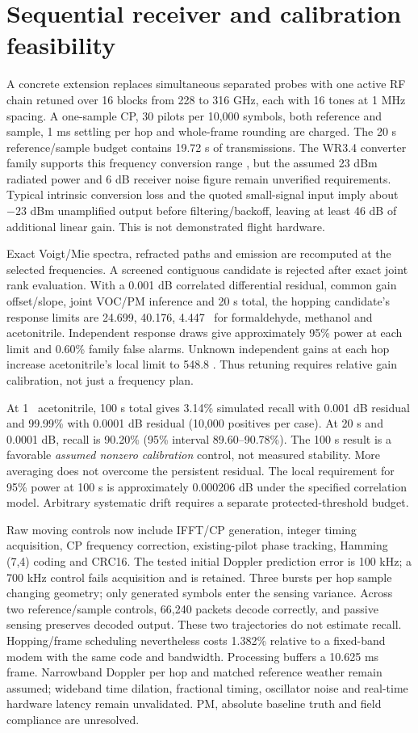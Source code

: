 \section{Sequential receiver and calibration feasibility}
A concrete extension replaces simultaneous separated probes with one active RF chain retuned over 16 blocks from 228 to 316 GHz, each with 16 tones at 1 MHz spacing. A one-sample CP, 30 pilots per 10,000 symbols, both reference and sample, 1 ms settling per hop and whole-frame rounding are charged. The 20 s reference/sample budget contains 19.72 s of transmissions. The WR3.4 converter family supports this frequency conversion range \cite{vdicc}, but the assumed 23 dBm radiated power and 6 dB receiver noise figure remain unverified requirements. Typical intrinsic conversion loss and the quoted small-signal input imply about $-23$ dBm unamplified output before filtering/backoff, leaving at least 46 dB of additional linear gain. This is not demonstrated flight hardware.

Exact Voigt/Mie spectra, refracted paths and emission are recomputed at the selected frequencies. A screened contiguous candidate is rejected after exact joint rank evaluation. With a 0.001 dB correlated differential residual, common gain offset/slope, joint VOC/PM inference and 20 s total, the hopping candidate's response limits are 24.699, 40.176, 4.447 \ugm\ for formaldehyde, methanol and acetonitrile. Independent response draws give approximately 95\% power at each limit and 0.60\% family false alarms. Unknown independent gains at each hop increase acetonitrile's local limit to 548.8 \ugm. Thus retuning requires relative gain calibration, not just a frequency plan.

At 1 \ugm\ acetonitrile, 100 s total gives 3.14\% simulated recall with 0.001 dB residual and 99.99\% with 0.0001 dB residual (10,000 positives per case). At 20 s and 0.0001 dB, recall is 90.20\% (95\% interval 89.60--90.78\%). The 100 s result is a favorable \emph{assumed nonzero calibration} control, not measured stability. More averaging does not overcome the persistent residual. The local requirement for 95\% power at 100 s is approximately 0.000206 dB under the specified correlation model. Arbitrary systematic drift requires a separate protected-threshold budget.

Raw moving controls now include IFFT/CP generation, integer timing acquisition, CP frequency correction, existing-pilot phase tracking, Hamming (7,4) coding and CRC16. The tested initial Doppler prediction error is 100 kHz; a 700 kHz control fails acquisition and is retained. Three bursts per hop sample changing geometry; only generated symbols enter the sensing variance. Across two reference/sample controls, 66,240 packets decode correctly, and passive sensing preserves decoded output. These two trajectories do not estimate recall. Hopping/frame scheduling nevertheless costs 1.382\% relative to a fixed-band modem with the same code and bandwidth. Processing buffers a 10.625 ms frame. Narrowband Doppler per hop and matched reference weather remain assumed; wideband time dilation, fractional timing, oscillator noise and real-time hardware latency remain unvalidated. PM, absolute baseline truth and field compliance are unresolved.

